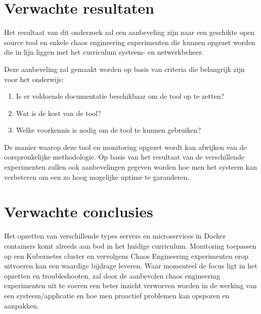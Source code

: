\section{Verwachte resultaten}
\label{sec:verwachte_resultaten}

Het resultaat van dit onderzoek zal een aanbeveling zijn naar een geschikte open source tool en enkele chaos engineering experimenten die kunnen opgezet worden die in lijn liggen met het curriculum systeem- en netwerkbeheer. 

Deze aanbeveling zal gemaakt worden op basis van criteria die belangrijk zijn voor het onderwijs:
\begin{enumerate}
    \item Is er voldoende documentatie beschikbaar om de tool op te zetten?
    \item Wat is de kost van de tool? 
    \item Welke voorkennis is nodig om de tool te kunnen gebruiken?
\end{enumerate}

De manier waarop deze tool en monitoring opgezet wordt kan afwijken van de oorspronkelijke methodologie. 
Op basis van het resultaat van de verschillende experimenten zullen ook aanbevelingen gegeven worden hoe men het systeem kan verbeteren om een zo hoog mogelijke uptime te garanderen. 

\section{Verwachte conclusies}
\label{sec:verwachte_conclusies}

Het opzetten van verschillende types servers en microservices in Docker containers komt alreeds aan bod in het huidige curriculum. Monitoring toepassen op een Kubernetes cluster en vervolgens Chaos Engineering experimenten erop uitvoeren kan een waardige bijdrage leveren.
Waar momenteel de focus ligt in het opzetten en troubleshooten, zal door de aanbevolen chaos engineering experimenten uit te voeren een beter inzicht verworven worden in de werking van een systeem/applicatie en hoe men proactief problemen kan opsporen en aanpakken. 


